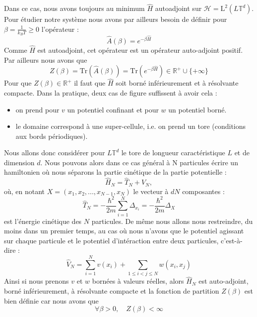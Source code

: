 \documentclass[11pt]{article}
\theoremstyle{definition}
\theoremstyle{remark}
\newcommand{\hham}{\hat{H}}
\newcommand{\dom}{L\mathbb{T}^d}
\begin{document}
Dans ce cas, nous avons toujours au minimum $\hham$ autoadjoint sur $\mathcal{H}=\mathrm{L}^2(\dom)$. Pour étudier notre système nous avons par ailleurs besoin de définir pour $\beta = \frac{1}{k_BT}\geq 0$ l'opérateur :
\begin{equation}
\hat{A}(\beta)=e^{-\beta \hham}
\end{equation} 
Comme $\hham$ est autoadjoint, cet opérateur est un opérateur auto-adjoint positif. Par ailleurs nous avons que 
\begin{equation}
Z(\beta)=\mathrm{Tr}(\hat{A}(\beta))=\mathrm{Tr}(e^{-\beta \hham})\in \mathbb{R}^+\cup \lbrace+\infty\rbrace
\end{equation}
Pour que $Z(\beta)\in\mathbb{R}^+$ il faut que $\hham$ soit borné inférieurement et à résolvante compacte. Dans la pratique, deux cas de figure suffissent à avoir cela :
\begin{itemize}
\item on prend pour $v$ un potentiel confinant et pour $w$ un potentiel borné.
\item le domaine correspond à une super-cellule, i.e. on prend un tore (conditions aux bords périodiques).
\end{itemize}
Nous allons donc considérer pour $\dom$ le tore de longueur caractéristique $L$ et de dimension $d$.
Nous pouvons alors dans ce cas général à N particules écrire un hamiltonien où nous séparons la partie cinétique de la partie potentielle :
\begin{equation}
\hham_N=\hat{T}_N+\hat{V}_N ,
\end{equation}
où, en notant $X=(x_1,x_2,...,x_{N-1},x_N)$ le vecteur à $dN$ composantes : 
\begin{equation}
\hat{T}_N=-\frac{\hbar^2}{2m}\sum_{i=1}^{N}\Delta_{x_i}=-\frac{\hbar^2}{2m}\Delta_X
\end{equation}
est l'énergie cinétique des $N$ particules.
De même nous allons nous restreindre, du moins dans un premier temps, au cas où nous n'avons que le potentiel agissant sur chaque particule et le potentiel d'intéraction entre deux particules, c'est-à-dire : 
\begin{equation}
\hat{V}_N=\sum_{i=1}^N v(x_i)+\sum_{1\leq i < j \leq N} w(x_i,x_j)
\end{equation}
Ainsi si nous prenons $v$ et $w$ bornées à valeurs réelles, alors $\hham_N$ est auto-adjoint, borné inférieurement, à résolvante compacte et la fonction de partition $Z(\beta)$ est bien définie car nous avons que 
\begin{equation}
\forall \beta>0,\quad Z(\beta)<\infty
\end{equation}
\end{document}

